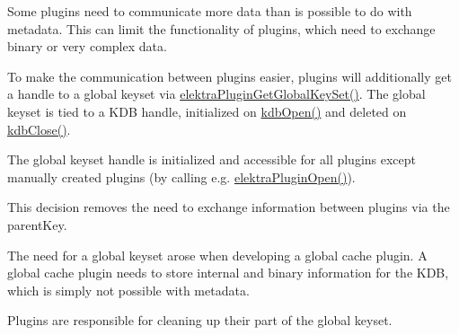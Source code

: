 Some plugins need to communicate more data than is possible to do with metadata. This can limit the functionality of plugins, which need to exchange binary or very complex data.

To make the communication between plugins easier, plugins will additionally get a handle to a global keyset via {\ttfamily \hyperlink{group__plugin_ga436cda13ed70c0face08661a90620bf6}{elektra\+Plugin\+Get\+Global\+Key\+Set()}}. The global keyset is tied to a K\+DB handle, initialized on {\ttfamily \hyperlink{group__kdb_ga844e1299a84c3fbf1d3a905c5c893ba5}{kdb\+Open()}} and deleted on {\ttfamily \hyperlink{group__kdb_gadb54dc9fda17ee07deb9444df745c96f}{kdb\+Close()}}.

The global keyset handle is initialized and accessible for all plugins except manually created plugins (by calling e.\+g. {\ttfamily \hyperlink{elektra_2plugin_8c_a32a70a7876542c51d153164ac5108a57}{elektra\+Plugin\+Open()}}).

This decision removes the need to exchange information between plugins via the parent\+Key.

The need for a global keyset arose when developing a global cache plugin. A global cache plugin needs to store internal and binary information for the K\+DB, which is simply not possible with metadata.

Plugins are responsible for cleaning up their part of the global keyset.